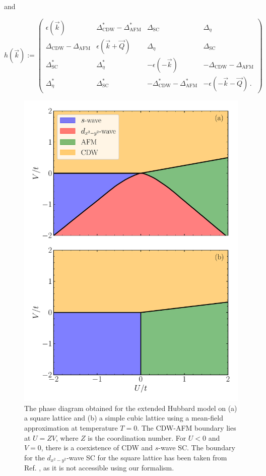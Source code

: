 \documentclass[
    reprint, 
    aps,
    preprintnumbers,
    twocolumn,
    prb,
    superscriptaddress
]{revtex4-2}
\newcommand{\vk}{\vec{k}}
\newcommand{\vQ}{\vec{Q}}
\begin{document}
and 

\begin{widetext}
\begin{equation}
    h(\vk) := \begin{pmatrix}
        \epsilon (\vk) & \Delta_\text{CDW}^* - \Delta_\text{AFM}^* & \Delta_\text{SC} & \Delta_\eta \\
        \Delta_\text{CDW} - \Delta_\text{AFM} & \epsilon (\vk + \vQ) & \Delta_\eta & \Delta_\text{SC} \\
        \Delta_\text{SC}^* & \Delta_\eta^* & - \epsilon (-\vk) & - \Delta_\text{CDW} - \Delta_\text{AFM} \\
        \Delta_\eta^* & \Delta_\text{SC}^* & - \Delta_\text{CDW}^* - \Delta_\text{AFM}^* & - \epsilon (-\vk - \vQ)\,.
        \end{pmatrix}
\end{equation}
\end{widetext}

\begin{figure}
    \centering
    \includegraphics[width=.48\textwidth]{plots/phase_diagram.pdf}
    \caption{The phase diagram obtained for the extended Hubbard model on (a) a square lattice and (b) a simple cubic lattice using a mean-field approximation at temperature $T=0$.
    The CDW-AFM boundary lies at $U = ZV$, where $Z$ is the coordination number. For $U<0$ and $V=0$, there is a coexistence of CDW and $s$-wave SC.
    The boundary for the $d_{x^2 - y^2}$-wave SC for the square lattice has been taken from Ref. \cite{Micnas88b}, as it is not accessible using our formalism.}
    \label{fig:phase_diagram}
\end{figure}
\end{document}

